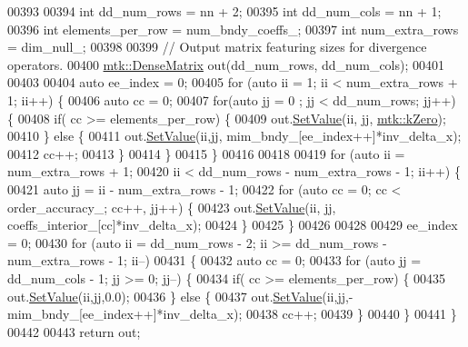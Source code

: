 \begin{DoxyCode}
{{00393 
00394   \textcolor{keywordtype}{int} dd\_num\_rows = nn + 2;
00395   \textcolor{keywordtype}{int} dd\_num\_cols = nn + 1;
00396   \textcolor{keywordtype}{int} elements\_per\_row = num\_bndy\_coeffs\_;
00397   \textcolor{keywordtype}{int} num\_extra\_rows = dim\_null\_;
00398 
00399   \textcolor{comment}{// Output matrix featuring sizes for divergence operators.}
00400   \hyperlink{classmtk_1_1DenseMatrix}{mtk::DenseMatrix} out(dd\_num\_rows, dd\_num\_cols);
00401 
00403 
00404   \textcolor{keyword}{auto} ee\_index = 0;
00405   \textcolor{keywordflow}{for} (\textcolor{keyword}{auto} ii = 1; ii < num\_extra\_rows + 1; ii++) \{
00406     \textcolor{keyword}{auto} cc = 0;
00407     \textcolor{keywordflow}{for}(\textcolor{keyword}{auto} jj = 0 ; jj < dd\_num\_rows; jj++) \{
00408       \textcolor{keywordflow}{if}( cc >= elements\_per\_row) \{
00409         out.\hyperlink{classmtk_1_1DenseMatrix_a784ce5784109ac86bfb9d8562b334b13}{SetValue}(ii, jj, \hyperlink{group__c01-roots_ga59a451a5fae30d59649bcda274fea271}{mtk::kZero});
00410       \} \textcolor{keywordflow}{else} \{
00411         out.\hyperlink{classmtk_1_1DenseMatrix_a784ce5784109ac86bfb9d8562b334b13}{SetValue}(ii,jj, mim\_bndy\_[ee\_index++]*inv\_delta\_x);
00412         cc++;
00413       \}
00414     \}
00415   \}
00416 
00418 
00419   \textcolor{keywordflow}{for} (\textcolor{keyword}{auto} ii = num\_extra\_rows + 1;
00420        ii < dd\_num\_rows - num\_extra\_rows - 1; ii++) \{
00421     \textcolor{keyword}{auto} jj = ii - num\_extra\_rows - 1;
00422     \textcolor{keywordflow}{for} (\textcolor{keyword}{auto} cc = 0; cc < order\_accuracy\_; cc++, jj++) \{
00423       out.\hyperlink{classmtk_1_1DenseMatrix_a784ce5784109ac86bfb9d8562b334b13}{SetValue}(ii, jj, coeffs\_interior\_[cc]*inv\_delta\_x);
00424     \}
00425   \}
00426 
00428 
00429   ee\_index = 0;
00430   \textcolor{keywordflow}{for} (\textcolor{keyword}{auto} ii = dd\_num\_rows - 2; ii >= dd\_num\_rows - num\_extra\_rows - 1; ii--)
00431 \{
00432     \textcolor{keyword}{auto} cc = 0;
00433     \textcolor{keywordflow}{for} (\textcolor{keyword}{auto} jj = dd\_num\_cols - 1; jj >= 0; jj--) \{
00434       \textcolor{keywordflow}{if}( cc >= elements\_per\_row) \{
00435         out.\hyperlink{classmtk_1_1DenseMatrix_a784ce5784109ac86bfb9d8562b334b13}{SetValue}(ii,jj,0.0);
00436       \} \textcolor{keywordflow}{else} \{
00437         out.\hyperlink{classmtk_1_1DenseMatrix_a784ce5784109ac86bfb9d8562b334b13}{SetValue}(ii,jj,-mim\_bndy\_[ee\_index++]*inv\_delta\_x);
00438         cc++;
00439       \}
00440      \}
00441   \}
00442 
00443   \textcolor{keywordflow}{return} out;
}}
\end{DoxyCode}

